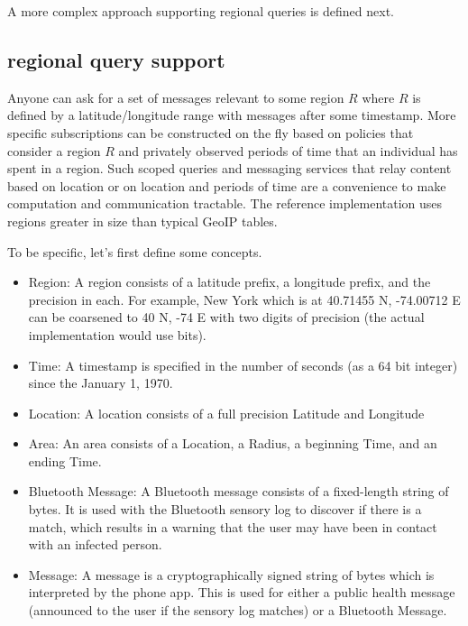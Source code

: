 \documentclass{article}
\begin{document}
A more complex approach supporting regional queries is defined next.  

\subsection{regional query support}
Anyone can ask for a set of messages relevant to some region $R$ where $R$ is defined by a latitude/longitude range with messages after some timestamp.  More specific subscriptions can be constructed on the fly based on policies that consider a region $R$ and privately observed periods of time that an individual has spent in a region. Such scoped queries and messaging services that relay content based on location or on location and periods of time are a convenience to make computation and communication tractable.  The reference implementation uses regions greater in size than typical GeoIP tables.

To be specific, let's first define some concepts.
\begin{itemize}
    \item Region: A region consists of a latitude prefix, a longitude prefix, and the precision in each.  For example, New York which is at 40.71455 N, -74.00712 E can be coarsened to 40 N, -74 E with two digits of precision (the actual implementation would use bits).
    \item Time: A timestamp is specified in the number of seconds (as a 64 bit integer) since the January 1, 1970. 
    \item Location: A location consists of a full precision Latitude and Longitude
    \item Area: An area consists of a Location, a Radius, a beginning Time, and an ending Time.
    \item Bluetooth Message: A Bluetooth message consists of a fixed-length string of bytes.  It is used with the Bluetooth sensory log to discover if there is a match, which results in a warning that the user may have been in contact with an infected person.  
    \item Message: A message is a cryptographically signed string of bytes which is interpreted by the phone app. This is used for either a public health message (announced to the user if the sensory log matches) or a Bluetooth Message. 
\end{itemize}
\end{document}
